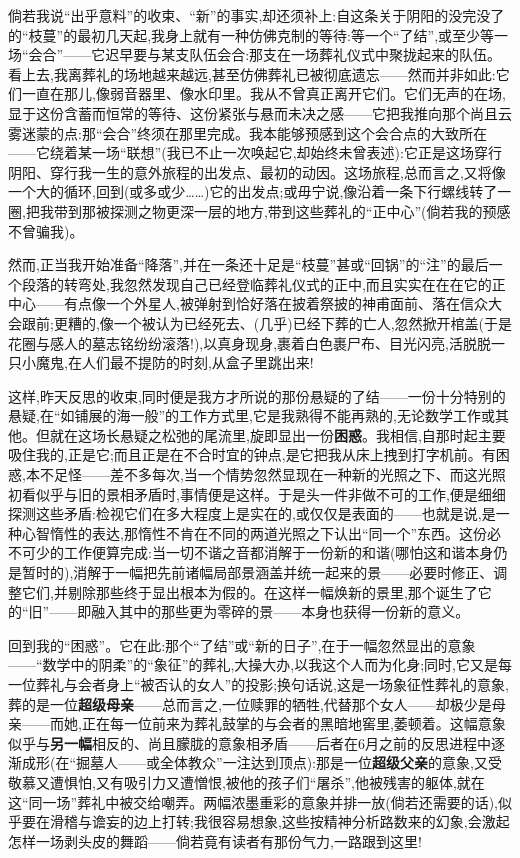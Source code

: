 倘若我说“出乎意料”的收束、“新”的事实,却还须补上:自这条关于阴阳的没完没了的“枝蔓”的最初几天起,我身上就有一种仿佛克制的等待:等一个“了结”,或至少等一场“会合”——它迟早要与某支队伍会合:那支在一场葬礼仪式中聚拢起来的队伍。看上去,我离葬礼的场地越来越远,甚至仿佛葬礼已被彻底遗忘——然而并非如此:它们一直在那儿,像弱音器里、像水印里。我从不曾真正离开它们。它们无声的在场,显于这份含蓄而恒常的等待、这份紧张与悬而未决之感——它把我推向那个尚且云雾迷蒙的点:那“会合”终须在那里完成。我本能够预感到这个会合点的大致所在——它绕着某一场“联想”(我已不止一次唤起它,却始终未曾表述):它正是这场穿行阴阳、穿行我一生的意外旅程的出发点、最初的动因。这场旅程,总而言之,又将像一个大的循环,回到(或多或少……)它的出发点;或毋宁说,像沿着一条下行螺线转了一圈,把我带到那被探测之物更深一层的地方,带到这些葬礼的“正中心”(倘若我的预感不曾骗我)。

然而,正当我开始准备“降落”,并在一条还十足是“枝蔓”甚或“回锅”的“注”的最后一个段落的转弯处,我忽然发现自己已经登临葬礼仪式的正中,而且实实在在在它的正中心——有点像一个外星人,被弹射到恰好落在披着祭披的神甫面前、落在信众大会跟前;更糟的,像一个被认为已经死去、(几乎)已经下葬的亡人,忽然掀开棺盖(于是花圈与感人的墓志铭纷纷滚落!),以真身现身,裹着白色裹尸布、目光闪亮,活脱脱一只小魔鬼,在人们最不提防的时刻,从盒子里跳出来!

这样,昨天反思的收束,同时便是我方才所说的那份悬疑的了结——一份十分特别的悬疑,在“如铺展的海一般”的工作方式里,它是我熟得不能再熟的,无论数学工作或其他。但就在这场长悬疑之松弛的尾流里,旋即显出一份\textbf{困惑}。我相信,自那时起主要吸住我的,正是它;而且正是在不合时宜的钟点,是它把我从床上拽到打字机前。有困惑,本不足怪——差不多每次,当一个情势忽然显现在一种新的光照之下、而这光照初看似乎与旧的景相矛盾时,事情便是这样。于是头一件非做不可的工作,便是细细探测这些矛盾:检视它们在多大程度上是实在的,或仅仅是表面的——也就是说,是一种心智惰性的表达,那惰性不肯在不同的两道光照之下认出“同一个”东西。这份必不可少的工作便算完成:当一切不谐之音都消解于一份新的和谐(哪怕这和谐本身仍是暂时的),消解于一幅把先前诸幅局部景涵盖并统一起来的景——必要时修正、调整它们,并剔除那些终于显出根本为假的。在这样一幅焕新的景里,那个诞生了它的“旧”\dmark{}——即融入其中的那些更为零碎的景——本身也获得一份新的意义。

回到我的“困惑”。它在此:那个“了结”或“新的日子”,在于一幅忽然显出的意象——“数学中的阴柔”的“象征”的葬礼,大操大办,以我这个人而为化身;同时,它又是每一位葬礼与会者身上“被否认的女人”的投影;换句话说,这是一场象征性葬礼的意象,葬的是一位\textbf{超级母亲}——总而言之,一位赎罪的牺牲,代替那个女人——却极少是母亲——而她,正在每一位前来为葬礼鼓掌的与会者的黑暗地窖里,萎顿着。这幅意象似乎与\textbf{另一幅}相反的、尚且朦胧的意象相矛盾——后者在6月之前的反思进程中逐渐成形(在“掘墓人——或全体教众”一注达到顶点):那是一位\textbf{超级父亲}的意象,又受敬慕又遭惧怕,又有吸引力又遭憎恨,被他的孩子们“屠杀”,他被残害的躯体,就在这“同一场”葬礼中被交给嘲弄。两幅浓墨重彩的意象并排一放(倘若还需要的话),似乎要在滑稽与谵妄的边上打转;我很容易想象,这些按精神分析路数来的幻象,会激起怎样一场剥头皮的舞蹈——倘若竟有读者有那份气力,一路跟到这里!

